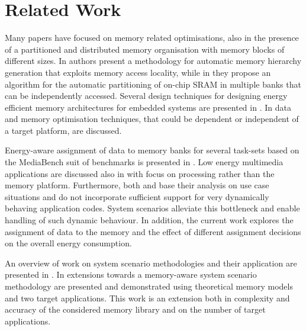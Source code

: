\documentclass{acm_proc_article-sp}
\begin{document}

\section{Related Work}
\label{sec:related}

Many papers have focused on memory related optimisations, also in the presence of a partitioned and distributed memory organisation with memory blocks of different sizes. In \cite{Ben00b} authors present a methodology for automatic memory hierarchy generation that exploits memory access locality, while in \cite{Ben00c} they propose an algorithm for the automatic partitioning of on-chip SRAM in multiple banks that can be independently accessed. Several design techniques for designing energy efficient memory architectures for embedded systems are presented in \cite{Mac02}. In \cite{Pgk01} data and memory optimisation techniques, that could be dependent or independent of a target platform, are discussed. 

Energy-aware assignment of data to memory banks for several task-sets based on the MediaBench suit of benchmarks is presented in \cite{Mar03}. Low energy multimedia applications are discussed also in \cite{Chu02} with focus on processing rather than the memory platform. Furthermore, both \cite{Mar03} and \cite{Chu02} base their analysis on use case situations and do not incorporate sufficient support for very dynamically behaving application codes. System scenarios alleviate this bottleneck and enable handling of such dynamic behaviour. In addition, the current work explores the assignment of data to the memory and the effect of different assignment decisions on the overall energy consumption.

An overview of work on system scenario methodologies and their application are presented in \cite{Gheorghita2007}. In \cite{Fil12} extensions towards a memory-aware system scenario methodology are presented and demonstrated using theoretical memory models and two target applications. This work is an extension both in complexity and accuracy of the considered memory library and on the number of target applications. 
\end{document}

